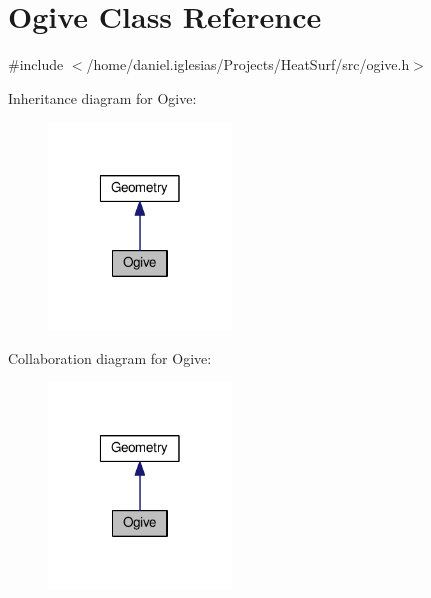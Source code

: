 \hypertarget{classOgive}{\section{Ogive Class Reference}
\label{classOgive}
}


{\ttfamily \#include $<$/home/daniel.\-iglesias/\-Projects/\-Heat\-Surf/src/ogive.\-h$>$}



Inheritance diagram for Ogive\-:\nopagebreak
\begin{figure}[H]
\begin{center}
\leavevmode
\includegraphics[width=138pt]{classOgive__inherit__graph}
\end{center}
\end{figure}


Collaboration diagram for Ogive\-:\nopagebreak
\begin{figure}[H]
\begin{center}
\leavevmode
\includegraphics[width=138pt]{classOgive__coll__graph}
\end{center}
\end{figure}
